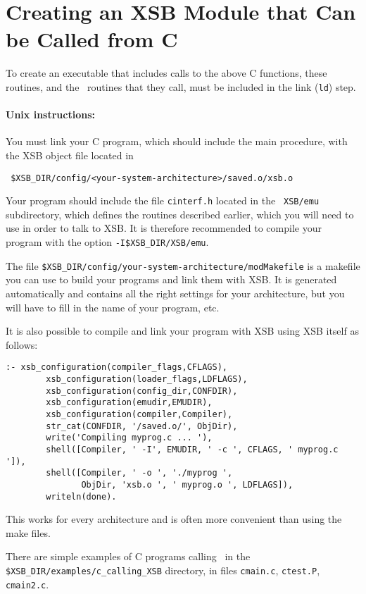 \section{Creating an XSB Module that Can be Called from C}

To create an executable that includes calls to the above C functions,
these routines, and the \ourprolog\ routines that they call, must be
included in the link ({\tt ld}) step.

\paragraph{Unix instructions:}
You must link your C program, which should include the main procedure, with
the XSB object file located in
\begin{verbatim}
 $XSB_DIR/config/<your-system-architecture>/saved.o/xsb.o  
\end{verbatim}
Your program should include the file {\tt cinterf.h} located in the {\tt
  XSB/emu} subdirectory, which defines the routines described earlier,
which you will need to use in order to talk to XSB.  It is therefore
recommended to compile your program with the option
\verb|-I$XSB_DIR/XSB/emu|.

The file {\tt \$XSB\_DIR/config/your-system-architecture/modMakefile} is a
makefile you can use to build your programs and link them with XSB.  It is
generated automatically and contains all the right settings for your
architecture, but you will have to fill in the name of your program, etc.

It is also possible to compile and link your program with XSB using XSB
itself as follows:
\begin{verbatim}
:- xsb_configuration(compiler_flags,CFLAGS),
        xsb_configuration(loader_flags,LDFLAGS),
        xsb_configuration(config_dir,CONFDIR),
        xsb_configuration(emudir,EMUDIR),
        xsb_configuration(compiler,Compiler),
        str_cat(CONFDIR, '/saved.o/', ObjDir),
        write('Compiling myprog.c ... '),
        shell([Compiler, ' -I', EMUDIR, ' -c ', CFLAGS, ' myprog.c ']),
        shell([Compiler, ' -o ', './myprog ',
               ObjDir, 'xsb.o ', ' myprog.o ', LDFLAGS]),
        writeln(done).  
\end{verbatim}
This works for every architecture and is often more convenient than using
the make files.

There are simple examples of C programs calling \ourprolog\ in the
{\tt \$XSB\_DIR/examples/c\_calling\_XSB} directory, in files {\tt cmain.c},
{\tt ctest.P}, {\tt cmain2.c}.


